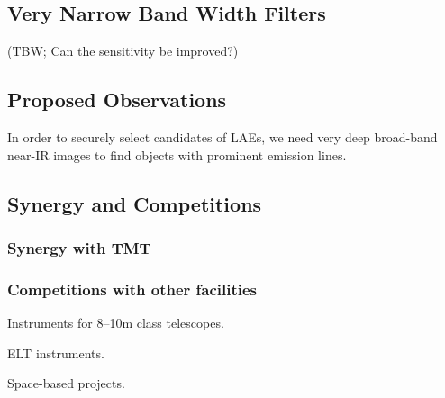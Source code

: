\subsection{Very Narrow Band Width Filters}

(TBW; Can the sensitivity be improved?)

\subsection{Proposed Observations}

In order to securely select candidates of LAEs, we need very deep
broad-band near-IR images to find objects with prominent emission
lines. 

\subsection{Synergy and Competitions}

\subsubsection{Synergy with TMT}

\subsubsection{Competitions with other facilities}

Instruments for 8--10m class telescopes.

ELT instruments.

Space-based projects.



